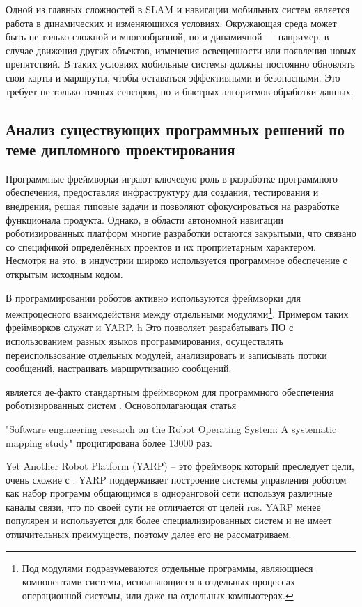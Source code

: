 Одной из главных сложностей в SLAM и навигации мобильных систем является работа
в динамических и изменяющихся условиях. Окружающая среда может быть не только
сложной и многообразной, но и динамичной — например, в случае движения других
объектов, изменения освещенности или появления новых препятствий. В таких
условиях мобильные системы должны постоянно обновлять свои карты и маршруты,
чтобы оставаться эффективными и безопасными. Это требует не только точных
сенсоров, но и быстрых алгоритмов обработки данных.

\subsection{Анализ существующих программных решений по теме дипломного
проектирования}

Программные фреймворки играют ключевую роль в разработке программного
обеспечения, предоставляя инфраструктуру для создания, тестирования и внедрения,
решая типовые задачи и позволяют сфокусироваться на разработке функционала
продукта. Однако, в области автономной навигации роботизированных платформ
многие разработки остаются закрытыми, что связано со спецификой определённых
проектов и их проприетарным характером. Несмотря на это, в индустрии широко
используется программное обеспечение с открытым исходным кодом.

В программировании роботов активно используются фреймворки для межпроцесного
взаимодействия между отдельными модулями\footnote{Под модулями подразумеваются
отдельные программы, являющиеся компонентами системы, исполняющиеся в отдельных
процессах операционной системы, или даже на отдельных компьютерах.}. Примером
таких фреймворков служат \ros{} и YARP.
h
Это позволяет разрабатывать ПО с использованием разных языков программирования,
осуществлять переиспользование отдельных модулей, анализировать и записывать
потоки сообщений, настраивать маршрутизацию сообщений.

\ros{} является де-факто стандартным фреймворком для программного обеспечения
роботизированных систем \cite{albonico2023software}. Основополагающая статья

"Software engineering research on the Robot Operating System: A systematic
mapping study"
\cite{quigley2009ros} процитирована более
\num{13000} раз.

Yet Another Robot Platform (YARP) \cite{metta2006yarp} -- это фреймворк который
преследует цели, очень схожие с \ros{}. YARP поддерживает построение системы
управления роботом как набор программ общающимся в одноранговой сети используя
различные каналы связи, что по своей сути не отличается от целей ros{}. YARP
менее популярен и используется для более специализированных систем и не имеет
отличительных преимуществ, поэтому далее его не рассматриваем.

